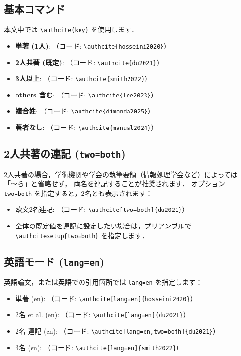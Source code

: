 \subsection{基本コマンド}
本文中では \verb|\authcite{key}| を使用します．
\begin{itemize}
  \item \textbf{単著 (1人)}: （コード: \verb|\authcite{hosseini2020}|）
  \item \textbf{2人共著 (既定)}: （コード: \verb|\authcite{du2021}|）
  \item \textbf{3人以上}: （コード: \verb|\authcite{smith2022}|）
  \item \textbf{others 含む}: （コード: \verb|\authcite{lee2023}|）
  \item \textbf{複合姓}: （コード: \verb|\authcite{dimonda2025}|）
  \item \textbf{著者なし}: （コード: \verb|\authcite{manual2024}|）
\end{itemize}

\subsection{2人共著の連記 (\texttt{two=both})}
2人共著の場合，学術機関や学会の執筆要領（情報処理学会など）によっては「〜ら」と省略せず，
両名を連記することが推奨されます．
オプション \texttt{two=both} を指定すると，2名とも表示されます：
\begin{itemize}
  \item 欧文2名連記: （コード: \verb|\authcite[two=both]{du2021}|）
  \item 全体の既定値を連記に設定したい場合は，プリアンブルで \verb|\authcitesetup{two=both}| を指定します．
\end{itemize}

\subsection{英語モード (\texttt{lang=en})}
英語論文，または英語での引用箇所では \texttt{lang=en} を指定します：
\begin{itemize}
  \item 単著 (en): （コード: \verb|\authcite[lang=en]{hosseini2020}|）
  \item 2名 et al. (en): （コード: \verb|\authcite[lang=en]{du2021}|）
  \item 2名 連記 (en): （コード: \verb|\authcite[lang=en,two=both]{du2021}|）
  \item 3名 (en): （コード: \verb|\authcite[lang=en]{smith2022}|）
\end{itemize}

